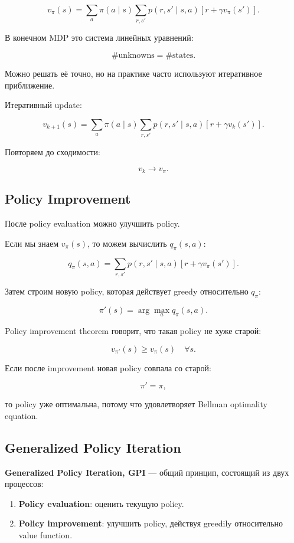 \documentclass[a4paper,12pt]{article}
\begin{document}
\[
v_\pi(s)
=
\sum_a
\pi(a\mid s)
\sum_{r,s'}
p(r,s'\mid s,a)
\left[
r + \gamma v_\pi(s')
\right].
\]

В конечном MDP это система линейных уравнений:

\[
\#\text{unknowns} = \#\text{states}.
\]

Можно решать её точно, но на практике часто используют итеративное приближение.

Итеративный update:

\[
v_{k+1}(s)
=
\sum_a
\pi(a\mid s)
\sum_{r,s'}
p(r,s'\mid s,a)
\left[
r + \gamma v_k(s')
\right].
\]

Повторяем до сходимости:

\[
v_k \rightarrow v_\pi.
\]

\subsection{Policy Improvement}

После policy evaluation можно улучшить policy.

Если мы знаем \(v_\pi(s)\), то можем вычислить \(q_\pi(s,a)\):

\[
q_\pi(s,a)
=
\sum_{r,s'}
p(r,s'\mid s,a)
\left[
r + \gamma v_\pi(s')
\right].
\]

Затем строим новую policy, которая действует greedy относительно \(q_\pi\):

\[
\pi'(s)
=
\arg\max_a q_\pi(s,a).
\]

Policy improvement theorem говорит, что такая policy не хуже старой:

\[
v_{\pi'}(s) \geq v_\pi(s)
\quad \forall s.
\]

Если после improvement новая policy совпала со старой:

\[
\pi' = \pi,
\]

то policy уже оптимальна, потому что удовлетворяет Bellman optimality equation.

\subsection{Generalized Policy Iteration}

\textbf{Generalized Policy Iteration, GPI} --- общий принцип, состоящий из двух процессов:

\begin{enumerate}
    \item \textbf{Policy evaluation}: оценить текущую policy.
    \item \textbf{Policy improvement}: улучшить policy, действуя greedily относительно value function.
\end{enumerate}
\end{document}
